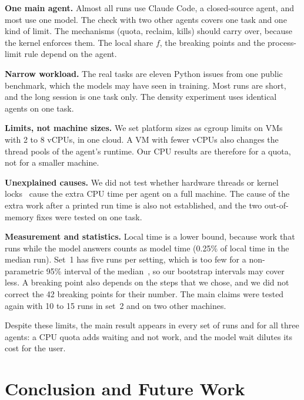 \documentclass[sigconf,review,anonymous]{acmart}
\begin{document}
\textbf{One main agent.} Almost all runs use Claude Code, a
closed-source agent, and most use one model. The check with two other
agents covers one task and one kind of limit. The mechanisms (quota,
reclaim, kills) should carry over, because the kernel enforces them. The
local share $f$, the breaking points and the process-limit rule depend
on the agent.

\textbf{Narrow workload.} The real tasks are eleven Python issues from
one public benchmark, which the models may have seen in training. Most
runs are short, and the long session is one task only. The density
experiment uses identical agents on one task.

\textbf{Limits, not machine sizes.} We set platform sizes as cgroup
limits on VMs with 2 to 8 vCPUs, in one cloud. A VM with fewer vCPUs
also changes the thread pools of the agent's runtime. Our CPU results
are therefore for a quota, not for a smaller machine.

\textbf{Unexplained causes.} We did not test whether hardware threads or
kernel locks~\cite{anjali2025} cause the extra CPU time per agent on a
full machine. The cause of the extra work after a printed run time is
also not established, and the two out-of-memory fixes were tested on one
task.

\textbf{Measurement and statistics.} Local time is a lower bound,
because work that runs while the model answers counts as model time
(0.25\% of local time in the median run). Set~1 has five runs per
setting, which is too few for a non-parametric 95\% interval of the
median~\cite{hoefler2015}, so our bootstrap intervals may cover less. A
breaking point also depends on the steps that we chose, and we did not
correct the 42 breaking points for their number. The main claims were
tested again with 10 to 15 runs in set~2 and on two other machines.

Despite these limits, the main result appears in every set of runs and
for all three agents: a CPU quota adds waiting and not work, and the
model wait dilutes its cost for the user.

\section{Conclusion and Future Work}
\end{document}

